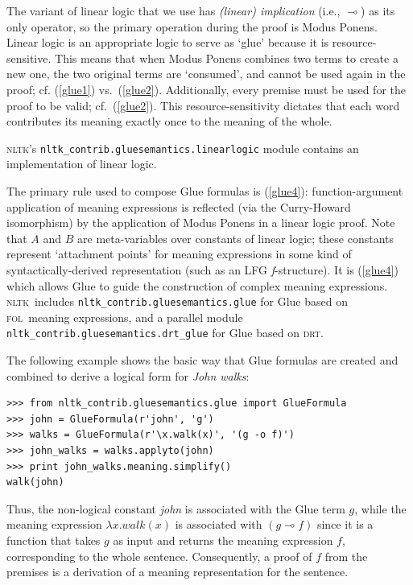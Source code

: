 \documentclass[11pt,a4paper]{article}
\newcommand{\DRT}{\textsc{drt}}
\newcommand{\FOL}{\textsc{fol}}
\newcommand{\NLTK}{\textsc{nltk}}
\newcommand{\dhgcode}[1]{{\tt #1}}
\begin{document}
The variant of linear logic that we use has \emph{(linear)
  implication} (i.e., $\multimap$)  as its
only operator, so the primary operation during the proof is Modus
Ponens.  Linear logic is an appropriate logic to serve as `glue'
because it is resource-sensitive.  This means that when Modus Ponens
combines two terms to create a new one, the two original
terms are `consumed', and cannot be used again in the proof;
cf. (\ref{glue1}) vs.\ (\ref{glue2}).
Additionally, every premise must be used for the proof to be valid;
cf.\ (\ref{glue2}).
This resource-sensitivity dictates that each word contributes its
meaning exactly once to the meaning of the whole.

\NLTK's \dhgcode{nltk\_contrib.gluesemantics.linearlogic} module
contains an implementation of linear logic. 

The primary rule used to compose Glue formulas is (\ref{glue4}):
function-argument application of meaning expressions is reflected (via
the Curry-Howard isomorphism) by the application of Modus Ponens in a
linear logic proof. Note that $A$ and $B$ are meta-variables over
constants of linear logic; these constants represent `attachment
points' for meaning expressions in some kind of syntactically-derived
representation (such as an LFG \textit{f}-structure).  It is
(\ref{glue4}) which allows Glue to guide the construction of complex
meaning expressions.   \NLTK\ includes
\dhgcode{nltk\_contrib.gluesemantics.glue} for Glue based on \FOL\
meaning expressions, and a parallel module
\dhgcode{nltk\_contrib.gluesemantics.drt\_glue} for Glue based on
\DRT.

The following example shows the basic way that
Glue formulas are created and combined to derive a logical form for
\textit{John walks}: 

\begin{verbatim}
>>> from nltk_contrib.gluesemantics.glue import GlueFormula
>>> john = GlueFormula(r'john', 'g')
>>> walks = GlueFormula(r'\x.walk(x)', '(g -o f)')
>>> john_walks = walks.applyto(john)
>>> print john_walks.meaning.simplify()
walk(john)
\end{verbatim}
Thus, the non-logical constant \textit{john} is associated with the
Glue term $g$, while the meaning expression $\lambda x.walk(x)$ is
associated with $(g \multimap f)$ since it is a function that
takes $g$ as input and returns the meaning expression $f$,
corresponding to the whole
sentence.  Consequently, a proof of $f$ from the premises is a derivation
of a meaning representation for the sentence.
\end{document}
